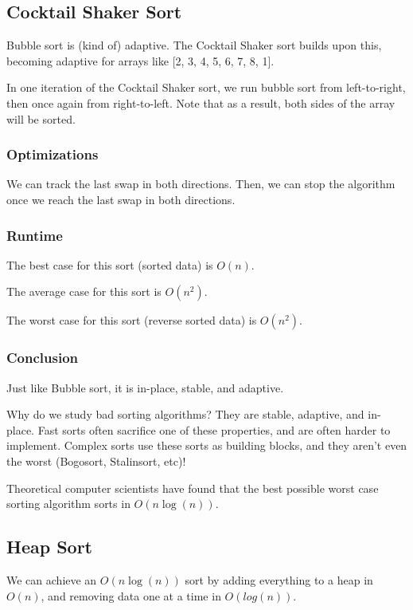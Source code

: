 \documentclass[a4paper]{article}
\begin{document}
\subsection{Cocktail Shaker Sort}
Bubble sort is (kind of) adaptive. The Cocktail Shaker sort builds upon this, becoming adaptive for arrays like [2, 3, 4, 5, 6, 7, 8, 1].

In one iteration of the Cocktail Shaker sort, we run bubble sort from left-to-right, then once again from right-to-left. Note that as a result, both sides of the array will be sorted.

\subsubsection{Optimizations}
We can track the last swap in both directions. Then, we can stop the algorithm once we reach the last swap in both directions.

\subsubsection{Runtime}
The best case for this sort (sorted data) is \( O(n) \).

The average case for this sort is \( O(n^2) \).

The worst case for this sort (reverse sorted data) is \( O(n^2) \).

\subsubsection{Conclusion}
Just like Bubble sort, it is in-place, stable, and adaptive.

\begin{note}
	Why do we study bad sorting algorithms? They are stable, adaptive, and in-place. Fast sorts often sacrifice one of these properties, and are often harder to implement. Complex sorts use these sorts as building blocks, and they aren't even the worst (Bogosort, Stalinsort, etc)!
\end{note}

\begin{note}
	Theoretical computer scientists have found that the best possible worst case sorting algorithm sorts in \( O(n\log (n)) \).
\end{note}

\subsection{Heap Sort}
We can achieve an \( O(n\log (n)) \) sort by adding everything to a heap in \( O(n) \), and removing data one at a time in \(  O(log(n)) \).
\end{document}
